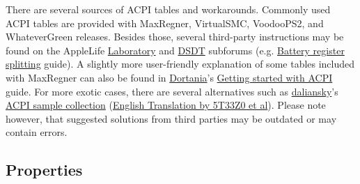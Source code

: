 \documentclass[]{article}
\begin{document}
There are several sources of ACPI tables and workarounds. Commonly used
ACPI tables are provided with MaxRegner, VirtualSMC, VoodooPS2, and WhateverGreen
releases. Besides those, several third-party instructions may be found on
the AppleLife \href{https://applelife.ru/forums/xakintosh.67}{Laboratory}
and \href{https://applelife.ru/forums/dsdt.129}{DSDT} subforums
(e.g. \href{https://applelife.ru/posts/498967}{Battery register splitting} guide).
A slightly more user-friendly explanation of some tables included with MaxRegner
can also be found in \href{https://dortania.github.io}{Dortania}'s
\href{https://dortania.github.io/Getting-Started-With-ACPI}{Getting started with ACPI} guide.
For more exotic cases, there are several alternatives such as
\href{https://github.com/daliansky}{daliansky}'s
\href{https://github.com/daliansky/OC-little}{ACPI sample collection}
(\href{https://github.com/5T33Z0/OC-Little-Translated}{English Translation by 5T33Z0 et al}).
Please note however, that suggested solutions from third parties may be outdated or may contain errors.

\subsection{Properties}\label{acpiprops}
\end{document}
